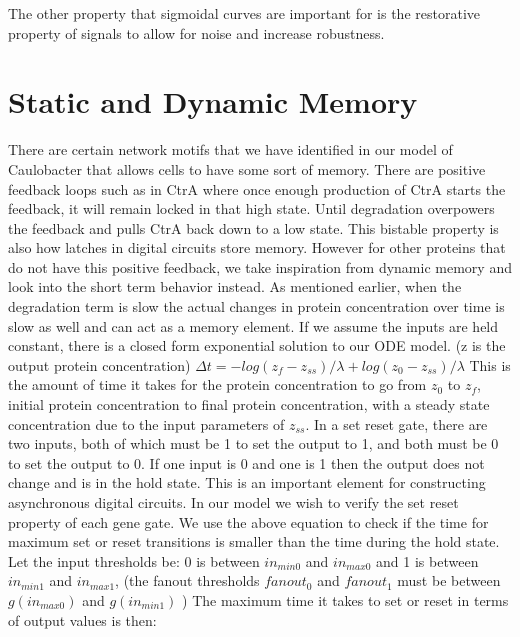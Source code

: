 \documentclass{article}
\begin{document}
\newline
The other property that sigmoidal curves are important for is the restorative property of signals to allow for noise and increase robustness.  
\section{Static and Dynamic Memory}
There are certain network motifs that we have identified in our model of Caulobacter that allows cells to have some sort of memory.  There are positive feedback loops such as in CtrA where once enough production of CtrA starts the feedback, it will remain locked in that high state.  Until degradation overpowers the feedback and pulls CtrA back down to a low state.  This bistable property is also how latches in digital circuits store memory.  However for other proteins that do not have this positive feedback, we take inspiration from dynamic memory and look into the short term behavior instead.  As mentioned earlier, when the degradation term is slow the actual changes in protein concentration over time is slow as well and can act as a memory element.  If we assume the inputs are held constant, there is a closed form exponential solution to our ODE model.  (z is the output protein concentration)
$\Delta t= -log(z_f-z_{ss})/ \lambda+ log(z_0-z_{ss})/ \lambda$ This is the amount of time it takes for the protein concentration to go from $z_0$ to $z_f$, initial protein concentration to final protein concentration, with a steady state concentration due to the input parameters of $z_{ss}$.
\newline
In a set reset gate, there are two inputs, both of which must be 1 to set the output to 1, and both must be 0 to set the output to 0.  If one input is 0 and one is 1 then the output does not change and is in the hold state.  This is an important element for constructing asynchronous digital circuits.  
In our model we wish to verify the set reset property of each gene gate.  We use the above equation to check if the time for maximum set or reset transitions is smaller than the time during the hold state.  
Let the input thresholds be:  0 is between $in_{min0}$ and $in_{max0}$ and 1 is between $in_{min1}$ and $in_{max1}$, (the fanout thresholds $fanout_0$ and $fanout_1$ must be between $g(in_{max0})$ and $g(in_{min1})$ )
The maximum time it takes to set or reset in terms of output values is then: \newline
\end{document}

